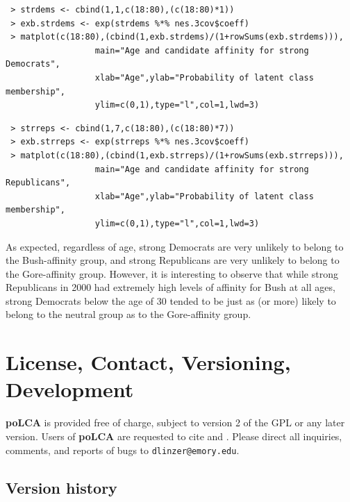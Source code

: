 \documentclass[letterpaper,12pt]{article}
\begin{document}
\newpage
\begin{verbatim}
 > strdems <- cbind(1,1,c(18:80),(c(18:80)*1))
 > exb.strdems <- exp(strdems %*% nes.3cov$coeff)
 > matplot(c(18:80),(cbind(1,exb.strdems)/(1+rowSums(exb.strdems))),
                  main="Age and candidate affinity for strong Democrats",
                  xlab="Age",ylab="Probability of latent class membership",
                  ylim=c(0,1),type="l",col=1,lwd=3)
\end{verbatim}

\begin{verbatim}
 > strreps <- cbind(1,7,c(18:80),(c(18:80)*7))
 > exb.strreps <- exp(strreps %*% nes.3cov$coeff)
 > matplot(c(18:80),(cbind(1,exb.strreps)/(1+rowSums(exb.strreps))),
                  main="Age and candidate affinity for strong Republicans",
                  xlab="Age",ylab="Probability of latent class membership",
                  ylim=c(0,1),type="l",col=1,lwd=3)
\end{verbatim}

As expected, regardless of age, strong Democrats are very unlikely to belong to the Bush-affinity group, and strong Republicans are very unlikely to belong to the Gore-affinity group.  However, it is interesting to observe that while strong Republicans in 2000 had extremely high levels of affinity for Bush at all ages, strong Democrats below the age of 30 tended to be just as (or more) likely to belong to the neutral group as to the Gore-affinity group.


\section{License, Contact, Versioning, Development}

\textbf{poLCA} is provided free of charge, subject to version 2 of the GPL or any later version. Users of \textbf{poLCA} are requested to cite \citet{poLCA} and \citet{LinzerLewisJSS}. Please direct all inquiries, comments, and reports of bugs to \texttt{dlinzer@emory.edu}.

\subsection{Version history}
\end{document}
